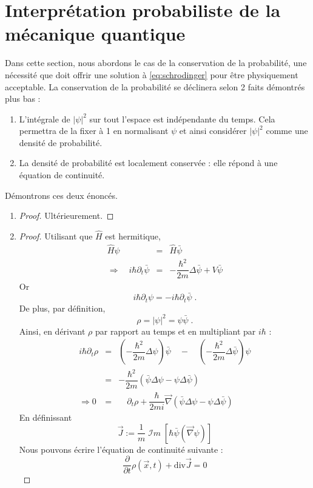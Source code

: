 \section{Interprétation probabiliste de la mécanique quantique}
Dans cette section, nous abordons le cas de la conservation de la probabilité, une nécessité que doit offrir une solution à \eqref{eq:schrodinger} pour être physiquement acceptable. La conservation de la probabilité se déclinera selon 2 faits démontrés plus bas :
\begin{enumerate}[label= (\alph*)]
\item L'intégrale de $|\psi|^2$ sur tout l'espace est indépendante du temps. Cela permettra de la fixer à 1 en normalisant $\psi$ et ainsi considérer $|\psi|^2$ comme une densité de probabilité.
\item La densité de probabilité est localement conservée : elle répond à une équation de continuité. \\
\end{enumerate}
Démontrons ces deux énoncés.
\begin{enumerate}[label= (\alph*)]
\item \begin{proof}
Ultérieurement.
\end{proof}
\item \begin{proof}
Utilisant que $\hat{H}$ est hermitique,
\begin{eqnarray*}
\hat{H}\psi &=& \hat{H} \bar{\psi} \\
 \Rightarrow \quad i\hbar \partial_t \bar{\psi} &=& -\dfrac{\hbar^2}{2m} \Delta \bar{\psi}+ V \bar{\psi} 
\end{eqnarray*}
Or $$i\hbar \partial_t \psi = -i\hbar \partial_t \bar{\psi} \; .$$
De plus, par définition, 
$$\rho = |\psi|^2 = \psi \bar{\psi} \; .$$
Ainsi, en dérivant $\rho$ par rapport au temps et en multipliant par $i\hbar$ :
\begin{eqnarray*}
i\hbar \partial_t \rho &=& \left(-\dfrac{\hbar^2}{2m} \Delta \psi\right) \bar{\psi} \quad - \quad \left(-\dfrac{\hbar^2}{2m} \Delta \bar{\psi}\right)\psi \\
&=& -\dfrac{\hbar^2}{2m} \left( \bar{\psi} \Delta \psi - \psi \Delta \bar{\psi} \right) \\
\Rightarrow 0 &=& \quad \partial_t \rho + \dfrac{\hbar}{2mi} \vec \nabla \left( \bar{\psi} \Delta \psi - \psi \Delta \bar{\psi} \right) 
\end{eqnarray*}
En définissant 
\begin{equation} \label{eq:courant_proba}
\vec J := \dfrac{1}{m} \; \mathcal{I}m \;\left[\hbar \bar{\psi}(\vec \nabla \psi)\right] 
\end{equation} 
Nous pouvons écrire l'équation de continuité suivante :
\begin{equation} \label{eq:continuite_proba}
\boxed{\dfrac{\partial}{\partial t} \rho(\vec x, t) + \mathrm{div} \vec J = 0}
\end{equation}
\end{proof}\end{enumerate}
